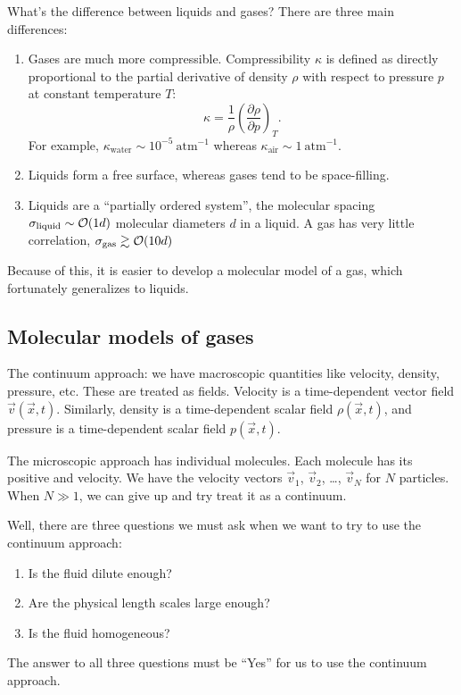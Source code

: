 \begin{node}
What's the difference between liquids and gases? There are three main
differences:
\begin{enumerate}
\item Gases are much more compressible. Compressibility $\kappa$ is defined as
  directly proportional to the partial derivative of density $\rho$
  with respect to pressure $p$ at constant temperature $T$:
  \begin{equation}
\kappa=\frac{1}{\rho}\left(\frac{\partial\rho}{\partial p}\right)_{T}.
  \end{equation}
  For example, $\kappa_{\text{water}}\sim10^{-5}~\mathrm{atm}^{-1}$
  whereas $\kappa_{\text{air}}\sim1~\mathrm{atm}^{-1}$.
\item Liquids form a free surface, whereas gases tend to be space-filling.
\item Liquids are a ``partially ordered system'', the molecular
  spacing $\sigma_{\text{liquid}}\sim\mathcal{O}(1d)$ molecular diameters $d$
  in a liquid. A gas has very little correlation, $\sigma_{\text{gas}}\gtrsim\mathcal{O}(10d)$
\end{enumerate}
Because of this, it is easier to develop a molecular model of a gas,
which fortunately generalizes to liquids.
\end{node}

\subsection{Molecular models of gases}

\begin{node}
The continuum approach: we have macroscopic quantities like velocity,
density, pressure, etc. These are treated as fields. Velocity is a
time-dependent vector field $\vec{v}(\vec{x},t)$. Similarly,
density is a time-dependent scalar field $\rho(\vec{x},t)$, and
pressure is a time-dependent scalar field $p(\vec{x},t)$.
\end{node}

\begin{node}
The microscopic approach has individual molecules. Each molecule has
its positive and velocity. We have the velocity vectors $\vec{v}_{1}$,
$\vec{v}_{2}$, \dots, $\vec{v}_{N}$ for $N$ particles. When $N\gg1$,
we can give up and try treat it as a continuum.

Well, there are three questions we must ask when we want to try to use
the continuum approach:
\begin{enumerate}
\item Is the fluid dilute enough?
\item Are the physical length scales large enough?
\item Is the fluid homogeneous?
\end{enumerate}
The answer to all three questions must be ``Yes'' for us to use the
continuum approach.
\end{node}

